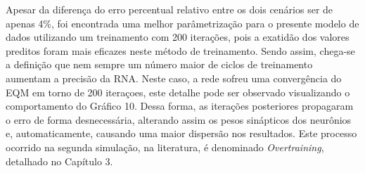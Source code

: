 Apesar da diferença do erro percentual relativo entre os dois cenários ser de apenas 4\%, foi encontrada uma melhor parâmetrização para o presente modelo de dados utilizando um treinamento com 200 iterações, pois a exatidão dos valores preditos foram mais eficazes neste método de treinamento. Sendo assim, chega-se a definição que nem sempre um número maior de ciclos de treinamento aumentam a precisão da RNA. Neste caso, a rede sofreu uma convergência do EQM em torno de 200 iteraçoes, este detalhe pode ser observado visualizando o comportamento do Gráfico 10. Dessa forma, as iterações posteriores propagaram o erro de forma desnecessária, alterando assim os pesos sinápticos dos neurônios e, automaticamente, causando uma maior dispersão nos resultados. Este processo ocorrido na segunda simulação, na literatura, é denominado \textit{Overtraining}, detalhado no Capítulo 3.
